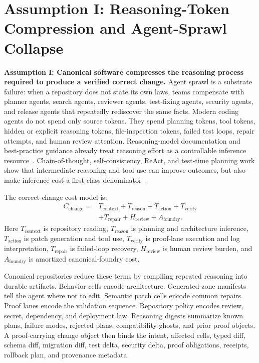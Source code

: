 \section{Assumption I: Reasoning-Token Compression and Agent-Sprawl Collapse}
\label{sec:reasoningcompression}

\textbf{Assumption I: Canonical software compresses the reasoning process required to produce a verified correct change.} Agent sprawl is a substrate failure: when a repository does not state its own laws, teams compensate with planner agents, search agents, reviewer agents, test-fixing agents, security agents, and release agents that repeatedly rediscover the same facts. Modern coding agents do not spend only source tokens. They spend planning tokens, tool tokens, hidden or explicit reasoning tokens, file-inspection tokens, failed test loops, repair attempts, and human review attention. Reasoning-model documentation and best-practice guidance already treat reasoning effort as a controllable inference resource~\cite{openaiReasoningDocs,openaiReasoningBestPractices}. Chain-of-thought, self-consistency, ReAct, and test-time planning work show that intermediate reasoning and tool use can improve outcomes, but also make inference cost a first-class denominator~\cite{chainOfThought,selfConsistency,react,planBudgetReasoning}.

The correct-change cost model is:
\begin{equation}
\begin{split}
C_{\text{change}} ={}& T_{\text{context}} + T_{\text{reason}} + T_{\text{action}} + T_{\text{verify}} \\
&+ T_{\text{repair}} + H_{\text{review}} + A_{\text{foundry}}.
\end{split}
\end{equation}
Here $T_{\text{context}}$ is repository reading, $T_{\text{reason}}$ is planning and architecture inference, $T_{\text{action}}$ is patch generation and tool use, $T_{\text{verify}}$ is proof-lane execution and log interpretation, $T_{\text{repair}}$ is failed-loop recovery, $H_{\text{review}}$ is human review burden, and $A_{\text{foundry}}$ is amortized canonical-foundry cost.

Canonical repositories reduce these terms by compiling repeated reasoning into durable artifacts. Behavior cells encode architecture. Generated-zone manifests tell the agent where not to edit. Semantic patch cells encode common repairs. Proof lanes encode the validation sequence. Repository policy encodes review, secret, dependency, and deployment law. Reasoning digests summarize known plans, failure modes, rejected plans, compatibility ghosts, and prior proof objects. A proof-carrying change object then binds the intent, affected cells, typed diff, schema diff, migration diff, test delta, security delta, proof obligations, receipts, rollback plan, and provenance metadata.

